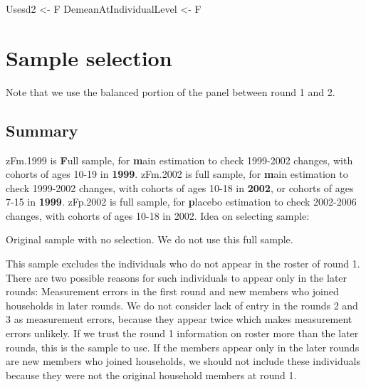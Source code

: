 \begin{Schunk}
\begin{Sinput}
Usesd2 <- F
DemeanAtIndividualLevel <- F
\end{Sinput}
\end{Schunk}


\section{Sample selection}

Note that we use the balanced portion of the panel between round 1 and 2. 

\subsection{Summary}

\textsf{zFm.1999} is \textbf{\textsf{F}}ull sample, for \textbf{\textsf{m}}ain estimation to check 1999-2002 changes, with cohorts of ages 10-19 in \textbf{\textsf{1999}}. \textsf{zFm.2002} is full sample, for \textbf{\textsf{m}}ain estimation to check 1999-2002 changes, with cohorts of ages 10-18 in \textbf{\textsf{2002}}, or cohorts of ages 7-15 in \textbf{\textsf{1999}}. \textsf{zFp.2002} is full sample, for \textbf{\textsf{p}}lacebo estimation to check 2002-2006 changes, with cohorts of ages 10-18 in 2002. 
Idea on selecting sample:
\begin{description}
\vspace{1.0ex}\setlength{\itemsep}{1.0ex}\setlength{\baselineskip}{12pt}
\item[zF, fulll]	Original sample with no selection. We do not use this full sample.
\item[zE, exist $==$ \{110, 111\}]	This sample excludes the individuals who do not appear in the roster of round 1. There are two possible reasons for such individuals to appear only in the later rounds: Measurement errors in the first round and new members who joined households in later rounds. We do not consider lack of entry in the rounds 2 and 3 as measurement errors, because they appear twice which makes measurement errors unlikely. If we trust the round 1 information on roster more than the later rounds, this is the sample to use. If the members appear only in the later rounds are new members who joined households, we should not include these individuals because they were not the original household members at round 1. 
\end{description}

